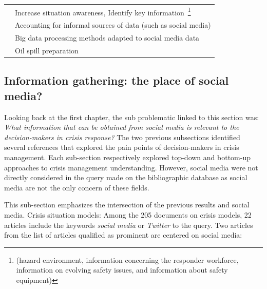 \begin{table}[hbp]
\begin{tabular}{m{} m{}}
        \cite{yangDesignPrinciplesIntegrated2012}                   & Increase situation awareness, Identify key information~\footnote{(hazard environment, information concerning the responder workforce, information on evolving safety issues, and information about safety equipment)} \\
        \cite{tapiaTrustworthyTweetDeeper2013}                      & Accounting for informal sources of data (such as social media)                                                                                                                                                        \\
        \cite{cobbDesigningDelugeUnderstanding2014}                 & Big data processing methods adapted to social media data                                                                                                                                                              \\
        \cite{cabreraaguileraModellingPerformanceVariabilities2016} & Oil spill preparation                                                                                                                                                                                                 \\
        \bottomrule
    \end{tabular}
    \label{table:business-needs-main-articles}
\end{table}

\subsection{Information gathering: the place of social media?}
Looking back at the first chapter, the sub problematic linked to this section was: \emph{What information that can be obtained from social media is relevant to the decision-makers in crisis response?}
The two previous subsections identified several references that explored the pain points of decision-makers in crisis management.
Each sub-section respectively explored top-down and bottom-up approaches to crisis management understanding.
However, social media were not directly considered in the query made on the bibliographic database as social media are not the only concern of these fields.

This sub-section emphasizes the intersection of the previous results and social media.
Crisis situation models:
Among the 205 documents on crisis models, 22 articles include the keywords \emph{social media} or \emph{Twitter} to the query.
Two articles from the list of articles qualified as prominent are centered on social media:

